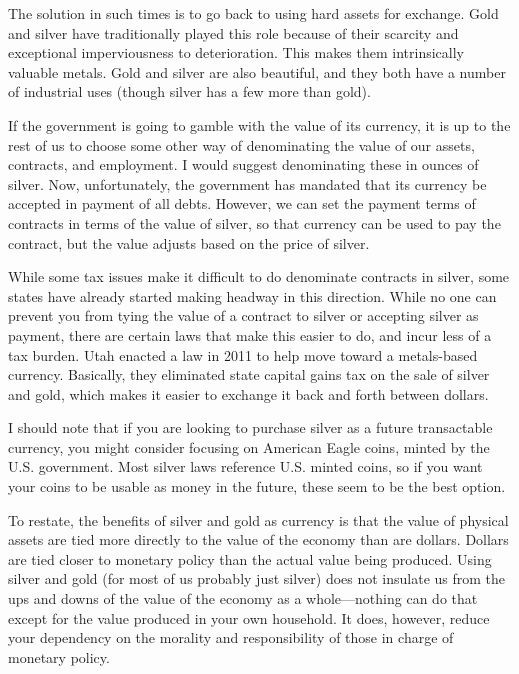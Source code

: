 The solution in such times is to go back to using hard assets for
exchange. Gold and silver have traditionally played this role because
of their scarcity and exceptional imperviousness to deterioration. This
makes them intrinsically valuable metals. Gold and silver are also
beautiful, and they both have a number of industrial uses (though
silver has a few more than gold).

If the government is going to gamble with the value of its currency, it
is up to the rest of us to choose some other way of denominating the
value of our assets, contracts, and employment. I would suggest
denominating these in ounces of silver. Now, unfortunately, the
government has mandated that its currency be accepted in payment of all
debts. However, we can set the payment terms of contracts in terms of
the value of silver, so that currency can be used to pay the contract,
but the value adjusts based on the price of silver. 

While some tax issues make it difficult to do denominate contracts in
silver, some states have already started making headway in this
direction. While no one can prevent you from tying the value of a
contract to silver or accepting silver as payment, there are certain
laws that make this easier to do, and incur less of a tax burden. Utah
enacted a law in 2011 to help move toward a metals-based currency.
Basically, they eliminated state capital gains tax on the sale of
silver and gold, which makes it easier to exchange it back and forth
between dollars.

I should note that if you are looking to purchase silver as a future
transactable currency, you might consider focusing on American Eagle
coins, minted by the U.S. government. Most silver laws reference U.S.
minted coins, so if you want your coins to be usable as money in the
future, these seem to be the best option.

To restate, the benefits of silver and gold as currency is that the
value of physical assets are tied more directly to the value of the
economy than are dollars.  Dollars are tied closer to monetary policy
than the actual value being produced. Using silver and gold (for most
of us probably just silver) does not insulate us from the ups and downs
of the value of the economy as a whole—nothing can do that except for
the value produced in your own household. It does, however, reduce your
dependency on the morality and responsibility of those in charge of
monetary policy.

